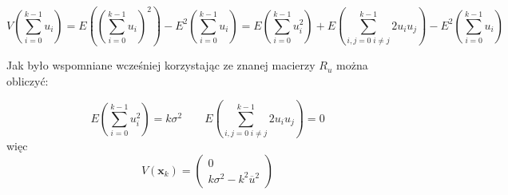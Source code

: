 \documentclass[10pt,a4paper]{article}
\begin{document}
\begin{equation}
V \left(\sum \limits_{i=0}^{k-1} u_i \right) = 
E \left( \left( \sum \limits_{i=0}^{k-1} u_i \right)^2 \right) - E^2 \left( \sum \limits_{i=0}^{k-1} u_i \right) =
E \left( \sum \limits_{i=0}^{k-1} u _i ^2  \right) + E \left( \sum \limits_{i,j=0 \; i \neq j} ^{k-1} 2u_i u_j \right) - E^2 \left( \sum \limits_{i=0}^{k-1} u_i \right)
\end{equation}

Jak było wspomniane wcześniej korzystając ze znanej macierzy $R_u$ można obliczyć:

\begin{equation}
E \left( \sum \limits_{i=0}^{k-1} u_i^2  \right) = k \sigma ^2 \qquad E \left( \sum \limits_{i,j=0 \; i \neq j}^{k-1} 2u_i u_j \right) = 0 
\end{equation}
więc 
\begin{equation}
	V \left( \textbf{x}_k \right) = 
	\left(
	\begin{matrix}
	0 \\ 
	k\sigma^2 - k^2 \overline{u}^2	
	\end{matrix}
\right)
\end{equation}
\end{document}
